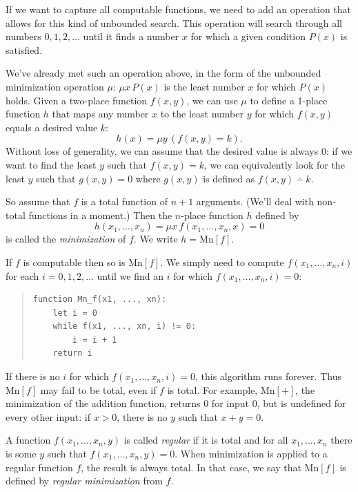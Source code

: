 If we want to capture all computable functions,
we need to add an operation that allows for this kind of unbounded search.
This operation will
search through all numbers $0,1,2,\ldots$
until it finds a number $x$ for which a given condition $P(x)$ is satisfied.

We've already met such an operation above,
in the form of the unbounded minimization operation $\mu$:
$\mu x \,P(x)$ is the least number $x$ for which $P(x)$ holds.
Given a two-place function $f(x,y)$,
we can use $\mu$ to define a 1-place function $h$
that maps any number $x$ to the least number $y$ for which
$f(x,y)$ equals a desired value $k$:
\[
  h(x) = \mu y \, (f(x,y) = k).
\]
Without loss of generality,
we can assume that the desired value is always 0:
if we want to find the least $y$ such that $f(x,y) = k$,
we can equivalently look for the least $y$ such that $g(x,y) = 0$
where $g(x,y)$ is defined as $f(x,y) \dotminus k$.

So assume that $f$ is a total function of $n+1$ arguments.
(We'll deal with non-total functions in a moment.)
Then the $n$-place function $h$ defined by
\[
  h(x_1, \ldots, x_n) = \mu x \, f(x_1, \ldots, x_n, x) = 0
\]
is called the \emph{minimization} of $f$.
We write $h = \mathrm{Mn}[f]$.

If $f$ is computable then so is $\mathrm{Mn}[f]$.
We simply need to compute
$f(x_{1},\ldots,x_{n},i)$ for each $i=0,1,2,\ldots$
until we find an $i$ for which
$f(x_{1},\ldots,x_{n},i) = 0$:

\begin{quote}\small
\begin{verbatim}
function Mn_f(x1, ..., xn):
    let i = 0
    while f(x1, ..., xn, i) != 0:
        i = i + 1
    return i
\end{verbatim}
\end{quote}

If there is no $i$ for which $f(x_{1},\ldots,x_{n},i) = 0$,
this algorithm runs forever.
Thus $\mathrm{Mn}[f]$ may fail to be total,
even if $f$ is total.
For example,
$\mathrm{Mn}[+]$,
the minimization of the addition function,
returns 0 for input 0,
but is undefined for every other input:
if $x>0$,
there is no $y$ such that $x + y = 0$.

A function $f(x_1, \ldots, x_n, y)$ is called \emph{regular} if it is total
and for all $x_1, \ldots, x_n$ there is some $y$ such that $f(x_1, \ldots, x_n, y) = 0$.
When minimization is applied to a regular function $f$,
the result is always total.
In that case,
we say that $\mathrm{Mn}[f]$ is defined by \emph{regular minimization} from $f$.

